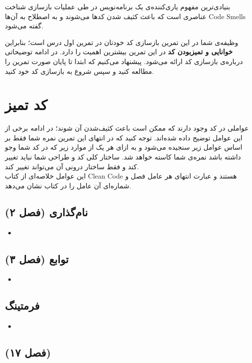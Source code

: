 \documentclass{utap}
\begin{document}
بنیادی‌ترین مفهوم یاری‌کننده‌ی یک برنامه‌نویس در طی عملیات بازسازی شناخت عناصری است که باعث کثیف شدن کدها می‌شوند و به اصطلاح به آن‌ها Code Smells گفته می‌شود.

وظیفه‌ی شما در این تمرین بازسازی کد خودتان در تمرین اول درس است؛ بنابراین \textbf{خوانایی و تمیزبودن کد} در این تمرین بیشترین اهمیت را دارد. در ادامه توضیحاتی درباره‌ی بازسازی کد اراﺋﻪ می‌شود. پیشنهاد می‌کنیم که ابتدا تا پایان صورت تمرین را مطالعه کنید و سپس شروع به بازسازی کد خود کنید.
\newpage
\section{کد تمیز}
عواملی در کد وجود دارند که ممکن است باعث کثیف‌شدن آن شوند؛ در ادامه برخی از این عوامل توضیح داده شده‌اند. توجه کنید که در انتهای این تمرین نمره شما فقط بر اساس عوامل زیر سنجیده می‌شود و به ازای هر یک از موارد زیر که در کد شما وجو داشته باشد نمره‌ی شما کاسته خواهد شد. ساختار کلی کد و طراحی شما نباید تغییر کند و فقط ساختار درونی آن می‌تواند تغییر کند.\\
این عوامل خلاصه‌ای از کتاب Clean Code هستند و عبارت انتهای هر عامل فصل و شماره‌ای آن عامل را در کتاب نشان می‌دهد.

\subsection{نام‌گذاری (فصل ۲)}
  \begin{itemize}
        \item
    \end{itemize}

\subsection{توابع (فصل ۳)}
  \begin{itemize}
        \item
    \end{itemize}

\subsection{فرمتینگ}
  \begin{itemize}
        \item 
    \end{itemize}


\subsection{ (فصل ۱۷)}
\end{document}
